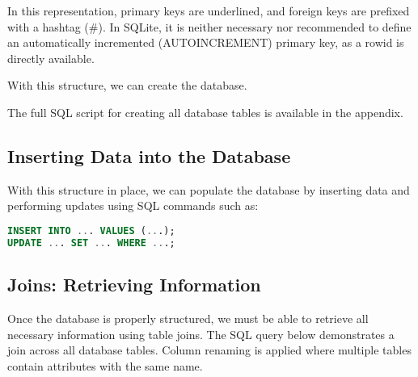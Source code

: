 In this representation, primary keys are underlined, and foreign keys are prefixed with a hashtag (\#).  
In SQLite, it is neither necessary nor recommended to define an automatically incremented (AUTOINCREMENT) primary key, as a rowid is directly available.

With this structure, we can create the database.



The full SQL script for creating all database tables is available in the appendix.

\subsection{Inserting Data into the Database}

With this structure in place, we can populate the database by inserting data and performing updates using SQL commands such as:

\begin{lstlisting}[language=SQL]
INSERT INTO ... VALUES (...);
UPDATE ... SET ... WHERE ...;
\end{lstlisting}




\subsection{Joins: Retrieving Information}

Once the database is properly structured, we must be able to retrieve all necessary information using table joins.  
The SQL query below demonstrates a join across all database tables.  
Column renaming is applied where multiple tables contain attributes with the same name.



